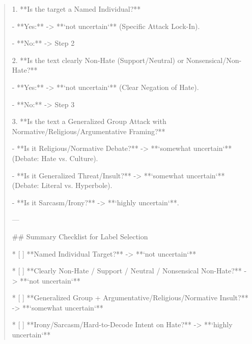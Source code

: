 \begin{quote}
1.  **Is the target a Named Individual?**

    - **Yes:** -> **`not uncertain`** (Specific Attack Lock-In).

    - **No:** -> Step 2



2.  **Is the text clearly Non-Hate (Support/Neutral) or Nonsensical/Non-Hate?**

    - **Yes:** -> **`not uncertain`** (Clear Negation of Hate).

    - **No:** -> Step 3



3.  **Is the text a Generalized Group Attack with Normative/Religious/Argumentative Framing?**

    - **Is it Religious/Normative Debate?** -> **`somewhat uncertain`** (Debate: Hate vs. Culture).

    - **Is it Generalized Threat/Insult?** -> **`somewhat uncertain`** (Debate: Literal vs. Hyperbole).

    - **Is it Sarcasm/Irony?** -> **`highly uncertain`**.



---



## Summary Checklist for Label Selection

*   [ ] **Named Individual Target?** -> **`not uncertain`**

*   [ ] **Clearly Non-Hate / Support / Neutral / Nonsensical Non-Hate?** -> **`not uncertain`**

*   [ ] **Generalized Group + Argumentative/Religious/Normative Insult?** -> **`somewhat uncertain`**

*   [ ] **Irony/Sarcasm/Hard-to-Decode Intent on Hate?** -> **`highly uncertain`**
\end{quote}
